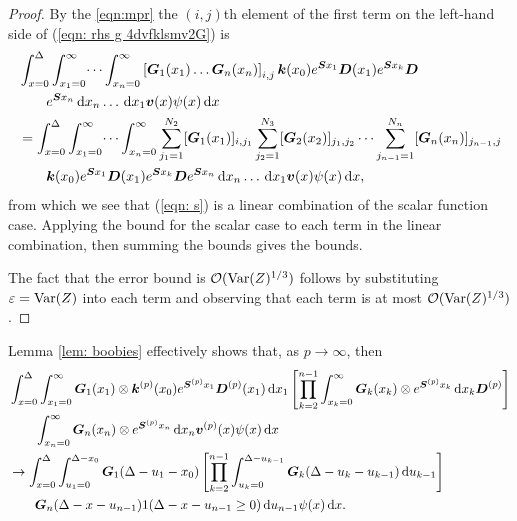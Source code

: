 \begin{proof}
	By the \ref{eqn:mpr} the \((i,j)\)th element of the first term on the left-hand side of (\ref{eqn: rhs g 4dvfklsmv2G}) is 
	\begin{align}
		&\int_{x=0}^\Delta \int_{x_1=0}^\infty \dots \int_{x_n=0}^\infty \left[\boldsymbol G_1(x_1)\dots \boldsymbol G_n(x_n)\right]_{i,j} \boldsymbol k(x_0) e^{\boldsymbol{S}x_1} \boldsymbol D (x_1) 
		e^{\boldsymbol{S}x_k} \boldsymbol D \nonumber
		\\&\qquad{} e^{\boldsymbol{S}x_n} \, \mathrm{d} x_n \dots \, \mathrm{d} x_1 {\boldsymbol v}(x) \psi(x) \, \mathrm{d} x \nonumber 
		\\&= \int_{x=0}^\Delta \int_{x_1=0}^\infty \dots \int_{x_n=0}^\infty \sum_{j_1=1}^{N_2}[\boldsymbol G_1(x_1)]_{i,j_1}\sum_{j_2=1}^{N_3}[\boldsymbol G_2(x_2)]_{j_1,j_2}\dots \sum_{j_{n-1}=1}^{N_n} [\boldsymbol G_n(x_n)]_{j_{n-1},j} \nonumber
		\\&\qquad{} \boldsymbol k(x_0) e^{\boldsymbol{S}x_1} \boldsymbol D (x_1) 
		e^{\boldsymbol{S}x_k} \boldsymbol D 
		e^{\boldsymbol{S}x_n} \, \mathrm{d} x_n \dots \, \mathrm{d} x_1 {\boldsymbol v}(x) \psi(x) \, \mathrm{d} x, \label{eqn: s}
	\end{align}
	from which we see that (\ref{eqn: s}) is a linear combination of the scalar function case. Applying the bound for the scalar case to each term in the linear combination, then summing the bounds gives the bounds. 

	The fact that the error bound is \(\mathcal O(\mathrm{Var}(Z)^{1/3})\) follows by substituting \(\varepsilon=\mathrm{Var}(Z)\) into each term and observing that each term is at most \(\mathcal O(\mathrm{Var}(Z)^{1/3})\). 
\end{proof}
Lemma \ref{lem: boobies} effectively shows that, as \(p \to \infty\), then 
\begin{align}
	& \int_{x=0}^\Delta \int_{x_1=0}^\infty \bs G_1(x_1) \otimes \bs k^{(p)} (x_0) e^{\bs{S}^{(p)}x_1} \bs D^{(p)} (x_1) \wrt x_1
	\left[\prod_{k=2}^{n-1}\int_{x_k=0}^\infty \bs G_{k }(x_k) \otimes e^{\bs{S}^{(p)}x_k} \wrt x_k \bs D^{(p)}\right] \nonumber
\\&\qquad{}\int_{x_n=0}^\infty \bs G_{n }(x_n)\otimes e^{\bs{S}^{(p)}x_n} \wrt x_n {\bs v}^{(p)}(x) \psi(x) \wrt x \nonumber 
%
	\\&{}\to \int_{x=0}^\Delta \int_{u_1=0}^{\Delta-x_0}\bs G_1(\Delta - u_1 - x_0)
	\left[\prod_{k=2}^{n-1} \int_{u_k=0}^{\Delta-u_{k-1}} \bs G_{k}(\Delta-u_k-u_{k-1})\wrt u_{k-1}\right] \nonumber 
			\\&\qquad{} \bs G_{n }(\Delta - x-u_{n-1})
		1(\Delta-x-u_{n-1}\geq0) \wrt u_{n-1}\psi(x) \wrt x \nonumber.
\end{align}
